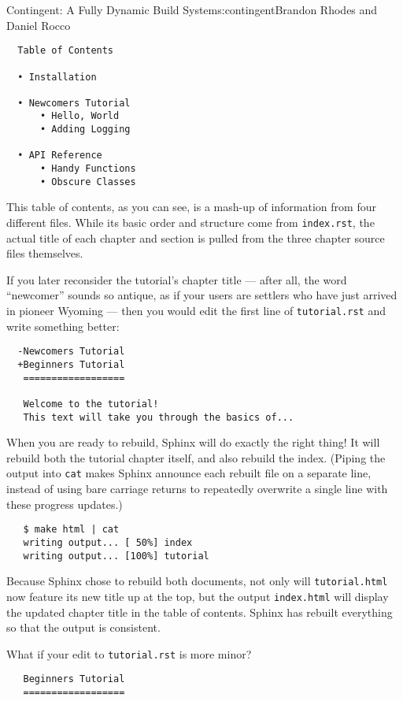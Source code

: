 \begin{aosachapter}{Contingent: A Fully Dynamic Build System}{s:contingent}{Brandon Rhodes and Daniel Rocco}
\begin{verbatim}
  Table of Contents

  • Installation

  • Newcomers Tutorial
      • Hello, World
      • Adding Logging

  • API Reference
      • Handy Functions
      • Obscure Classes
\end{verbatim}

This table of contents, as you can see, is a mash-up of information from
four different files. While its basic order and structure come from
\texttt{index.rst}, the actual title of each chapter and section is
pulled from the three chapter source files themselves.

If you later reconsider the tutorial's chapter title --- after all, the
word ``newcomer'' sounds so antique, as if your users are settlers who
have just arrived in pioneer Wyoming --- then you would edit the first
line of \texttt{tutorial.rst} and write something better:

\begin{verbatim}
  -Newcomers Tutorial
  +Beginners Tutorial
   ==================

   Welcome to the tutorial!
   This text will take you through the basics of...
\end{verbatim}

When you are ready to rebuild, Sphinx will do exactly the right thing!
It will rebuild both the tutorial chapter itself, and also rebuild the
index. (Piping the output into \texttt{cat} makes Sphinx announce each
rebuilt file on a separate line, instead of using bare carriage returns
to repeatedly overwrite a single line with these progress updates.)

\begin{verbatim}
   $ make html | cat
   writing output... [ 50%] index
   writing output... [100%] tutorial
\end{verbatim}

Because Sphinx chose to rebuild both documents, not only will
\texttt{tutorial.html} now feature its new title up at the top, but the
output \texttt{index.html} will display the updated chapter title in the
table of contents. Sphinx has rebuilt everything so that the output is
consistent.

What if your edit to \texttt{tutorial.rst} is more minor?

\begin{verbatim}
   Beginners Tutorial
   ==================


\end{verbatim}
\end{aosachapter}
